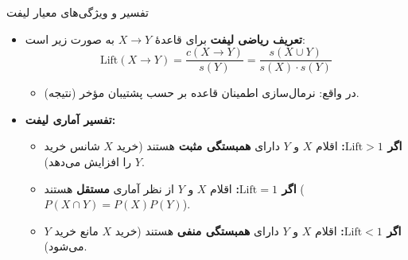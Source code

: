 \begin{frame}{تفسیر و ویژگی‌های معیار لیفت}{}
\begin{itemize}\setlength{\itemsep}{6pt}
    \item \textbf{تعریف ریاضی لیفت} برای قاعدهٔ $X \to Y$ به صورت زیر است:
    \[
    \mathrm{Lift}(X \to Y) = \frac{c(X \to Y)}{s(Y)} = \frac{s(X \cup Y)}{s(X) \cdot s(Y)}
    \]
    \begin{itemize}\setlength{\itemsep}{2pt}
        \item در واقع: نرمال‌سازی اطمینان قاعده بر حسب پشتیبان مؤخر (نتیجه).
    \end{itemize}
    \vspace{0.2cm}
    \item \textbf{تفسیر آماری لیفت:}
    \begin{itemize}\setlength{\itemsep}{3pt}
        \item \textbf{اگر $\mathrm{Lift} > 1$:} اقلام $X$ و $Y$ دارای \alert{\textbf{همبستگی مثبت}} هستند (خرید $X$ شانس خرید $Y$ را افزایش می‌دهد).
        \item \textbf{اگر $\mathrm{Lift} = 1$:} اقلام $X$ و $Y$ از نظر آماری \textbf{مستقل} هستند ($P(X \cap Y) = P(X)P(Y)$).
        \item \textbf{اگر $\mathrm{Lift} < 1$:} اقلام $X$ و $Y$ دارای \alert{\textbf{همبستگی منفی}} هستند (خرید $X$ مانع خرید $Y$ می‌شود).
    \end{itemize}
\end{itemize}
\end{frame}

